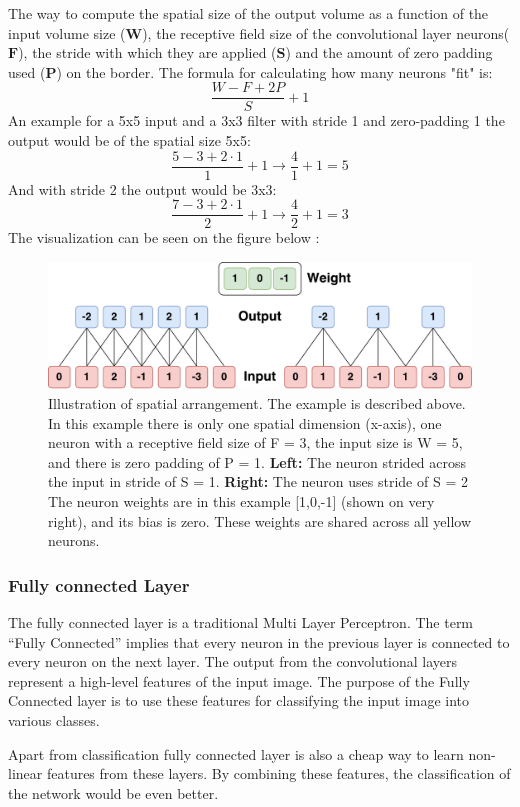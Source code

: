The way to compute the spatial size of the output volume as a function of the input volume size ($\textbf{W}$), the receptive field size of the convolutional layer neurons($\textbf{F}$), the stride with which they are applied ($\textbf{S}$) and the amount of zero padding used ($\textbf{P}$) on the border. The formula for calculating how many neurons "fit" is:
\begin{equation}
\frac{W-F+2P}{S}+1
\end{equation}    
An example for a 5x5 input and a 3x3 filter with stride 1 and zero-padding 1 the output would be of the spatial size 5x5:
\begin{equation}
\frac{5-3+2\cdot1 }{1}+1         \rightarrow             \frac{4}{1}+1 =5
\end{equation} 
And with stride 2 the output would be 3x3:
\begin{equation}
\frac{7-3+2\cdot1 }{2}+1         \rightarrow             \frac{4}{2}+1 =3
\end{equation} 
The visualization can be seen on the figure below : 

\begin{figure}[H]
	\centering
	\includegraphics[width=1\textwidth]{Figures/Spatial_size.pdf}
	\caption{Illustration of spatial arrangement. The example is described above. In this example there is only one spatial dimension (x-axis), one neuron with a receptive field size of F = 3, the input size is W = 5, and there is zero padding of P = 1. \textbf{Left:} The neuron strided across the input in stride of S = 1. \textbf{Right:} The neuron uses stride of S = 2
	The neuron weights are in this example [1,0,-1] (shown on very right), and its bias is zero. These weights are shared across all yellow neurons. \cite{CNN_course}}
	\label{fig:Spatial_size}
\end{figure} 

\subsubsection*{Fully connected Layer }
The fully connected layer is a traditional Multi Layer Perceptron. The term “Fully Connected” implies that every neuron in the previous layer is connected to every neuron on the next layer. The output from the convolutional layers represent a high-level features of the input image. The purpose of the Fully Connected layer is to use these features for classifying the input image into various classes. 

Apart from classification fully connected layer is also a cheap way to learn non-linear features from these layers. By combining these features, the classification of the network would be even better. \cite{Fully_Connected_Layer}         